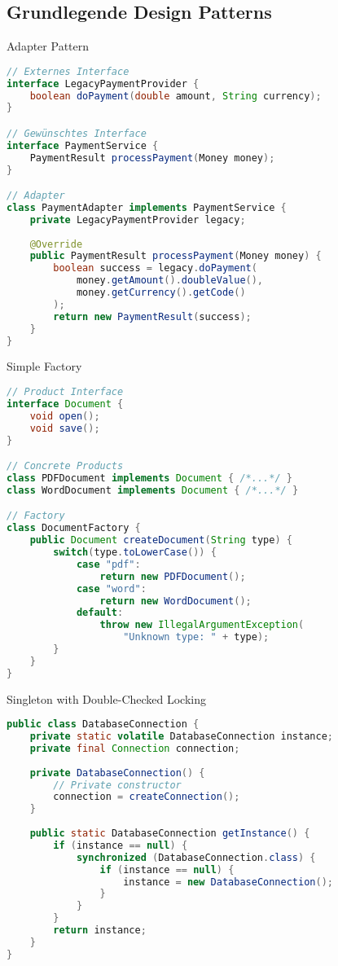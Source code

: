 \subsection{Grundlegende Design Patterns}

\begin{example}{Adapter Pattern}
\begin{lstlisting}[language=Java]
// Externes Interface
interface LegacyPaymentProvider {
    boolean doPayment(double amount, String currency);
}

// Gewünschtes Interface
interface PaymentService {
    PaymentResult processPayment(Money money);
}

// Adapter
class PaymentAdapter implements PaymentService {
    private LegacyPaymentProvider legacy;
    
    @Override
    public PaymentResult processPayment(Money money) {
        boolean success = legacy.doPayment(
            money.getAmount().doubleValue(),
            money.getCurrency().getCode()
        );
        return new PaymentResult(success);
    }
}
\end{lstlisting}
\end{example}

\begin{example}{Simple Factory}
\begin{lstlisting}[language=Java]
// Product Interface
interface Document {
    void open();
    void save();
}

// Concrete Products
class PDFDocument implements Document { /*...*/ }
class WordDocument implements Document { /*...*/ }

// Factory
class DocumentFactory {
    public Document createDocument(String type) {
        switch(type.toLowerCase()) {
            case "pdf": 
                return new PDFDocument();
            case "word": 
                return new WordDocument();
            default:
                throw new IllegalArgumentException(
                    "Unknown type: " + type);
        }
    }
}
\end{lstlisting}
\end{example}

\begin{example}{Singleton with Double-Checked Locking}
\begin{lstlisting}[language=Java]
public class DatabaseConnection {
    private static volatile DatabaseConnection instance;
    private final Connection connection;
    
    private DatabaseConnection() {
        // Private constructor
        connection = createConnection();
    }
    
    public static DatabaseConnection getInstance() {
        if (instance == null) {
            synchronized (DatabaseConnection.class) {
                if (instance == null) {
                    instance = new DatabaseConnection();
                }
            }
        }
        return instance;
    }
}
\end{lstlisting}
\end{example}

